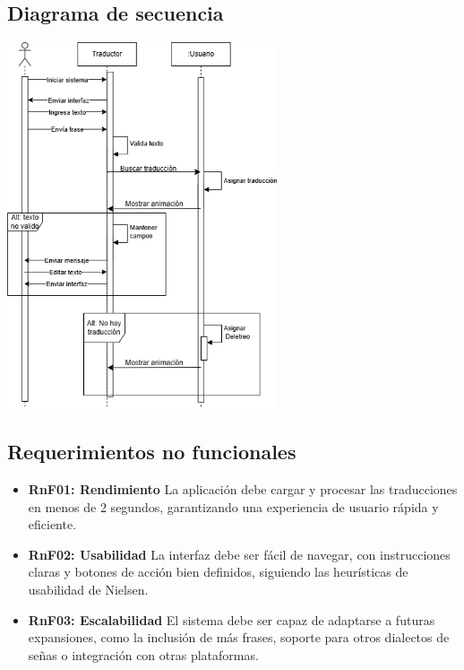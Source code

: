 \subsection{Diagrama de secuencia}
\begin{center}
    \includegraphics[width=0.6\textwidth]{Images/Cap 3/Secuencia.png}
\end{center}
\subsection{Requerimientos no funcionales}
\begin{itemize}
    \item \textbf{RnF01: Rendimiento}  
    La aplicación debe cargar y procesar las traducciones en menos de 2 segundos, garantizando una experiencia de usuario rápida y eficiente.
    
    \item \textbf{RnF02: Usabilidad}  
    La interfaz debe ser fácil de navegar, con instrucciones claras y botones de acción bien definidos, siguiendo las heurísticas de usabilidad de Nielsen.
    
    
    \item \textbf{RnF03: Escalabilidad}  
    El sistema debe ser capaz de adaptarse a futuras expansiones, como la inclusión de más frases, soporte para otros dialectos de señas o integración con otras plataformas.
\end{itemize}
